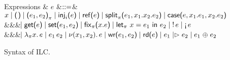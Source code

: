 \begin{figure*}[t]
\begin{comment}
    Affine types
    & $X,Y$
    &$\bnfas$& $\tyRd{S} \bnfalt \tyBang{A} \bnfalt
    \tyTensor{X}{Y}$
    \\
    Affine typings
    & $\Delta$
    &$\bnfas$& $\emptyctxt \bnfalt \Delta,x:X \bnfalt \Delta, \wrtok$
  \end{grammar}
  \end{comment}
  \begin{grammar}
    Expressions
    & $e$
        &$\mathrel{::=}$&
        $\eVar{x} \bnfalt \eUnit \bnfalt \ePair{e_1}{e_2} \bnfalt \eInj{i}{e}
    \bnfalt \eRef{e} \bnfalt \eSplit{e_1}{x_1}{x_2}{e_2} \bnfalt
    \eCase{e}{x_1}{e_1}{x_2}{e_2}$
    \\ &&& $\hspace{-1.02ex}\mathrel{\mid} \text{\textsf{get}}\textsf{(}{e}\textsf{)} \mathrel{\mid} \text{\textsf{set}}\textsf{(}{e_1},{e_2}\textsf{)} \mathrel{\mid} \text{\textsf{fix}}_{\pi}\textsf{(}{x}.{e}\textsf{)}
    \mathrel{\mid} \text{\textsf{let}}_{\pi}\ {x} = {e_1}\ \text{\textsf{in}}\ {e_2} \mathrel{\mid} {!}\,{e} \mathrel{\mid} \textnormal{!`}\,{e}$
    \\ &&& $\hspace{-1.02ex}\mathrel{\mid} \lambda_{\pi} {x}.\,{e} \mathrel{\mid} e_1\,e_2
    \mathrel{\mid} \nu(x_1,x_2).\,e \mathrel{\mid} \text{\textsf{wr}}\textsf{(}{e_1},{e_2}\textsf{)}
    \mathrel{\mid} \text{\textsf{rd}}\textsf{(}{e}\textsf{)} \mathrel{\mid} e_1 \mathrel{|\rhd} e_2 \mathrel{\mid} e_1 \mathrel{\oplus} e_2$
  \end{grammar}
  \caption{Syntax of ILC.}
  \label{fig:ilc-syntax}
\end{figure*}

